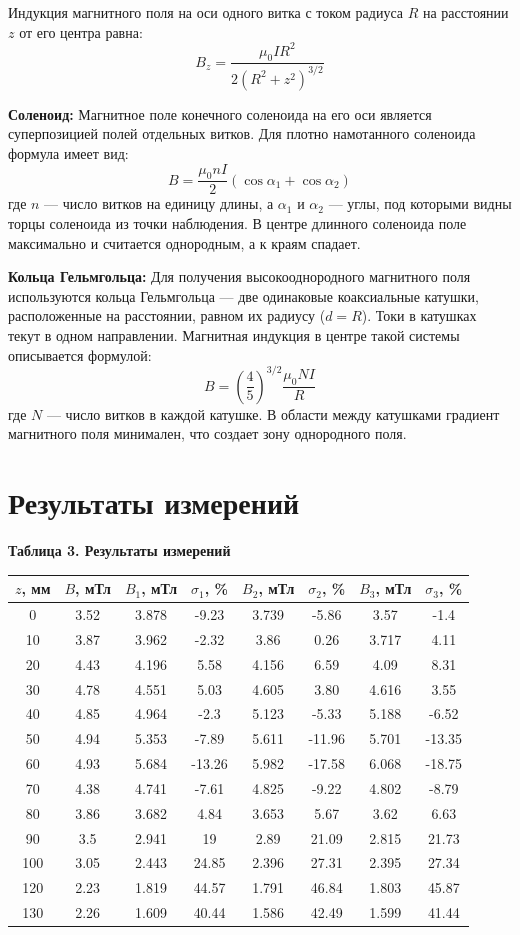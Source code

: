 \documentclass[a4paper,14pt]{extarticle}
\begin{document}
Индукция магнитного поля на оси одного витка с током радиуса $R$ на расстоянии $z$ от его центра равна:
$$B_z = \frac{\mu_0 I R^2}{2(R^2 + z^2)^{3/2}}$$

\textbf{Соленоид:}
Магнитное поле конечного соленоида на его оси является суперпозицией полей отдельных витков. Для плотно намотанного соленоида формула имеет вид:
$$B = \frac{\mu_0 n I}{2} (\cos\alpha_1 + \cos\alpha_2)$$
где $n$ — число витков на единицу длины, а $\alpha_1$ и $\alpha_2$ — углы, под которыми видны торцы соленоида из точки наблюдения. В центре длинного соленоида поле максимально и считается однородным, а к краям спадает.

\textbf{Кольца Гельмгольца:}
Для получения высокооднородного магнитного поля используются кольца Гельмгольца — две одинаковые коаксиальные катушки, расположенные на расстоянии, равном их радиусу ($d = R$). Токи в катушках текут в одном направлении. Магнитная индукция в центре такой системы описывается формулой:
$$B = \left(\frac{4}{5}\right)^{3/2} \frac{\mu_0 N I}{R}$$
где $N$ — число витков в каждой катушке. В области между катушками градиент магнитного поля минимален, что создает зону однородного поля.

\section*{Результаты измерений}

\begin{center}
\small
\textbf{Таблица 3. Результаты измерений}
\begin{tabular}{|c|c|c|c|c|c|c|c|}
\hline
$z$, мм & $B$, мТл & $B_1$, мТл & $\sigma_1$, \% & $B_2$, мТл & $\sigma_2$, \% & $B_3$, мТл & $\sigma_3$, \% \\ \hline
0 & 3.52 & 3.878 & -9.23 & 3.739 & -5.86 & 3.57 & -1.4 \\ \hline
10 & 3.87 & 3.962 & -2.32 & 3.86 & 0.26 & 3.717 & 4.11 \\ \hline
20 & 4.43 & 4.196 & 5.58 & 4.156 & 6.59 & 4.09 & 8.31 \\ \hline
30 & 4.78 & 4.551 & 5.03 & 4.605 & 3.80 & 4.616 & 3.55 \\ \hline
40 & 4.85 & 4.964 & -2.3 & 5.123 & -5.33 & 5.188 & -6.52 \\ \hline
50 & 4.94 & 5.353 & -7.89 & 5.611 & -11.96 & 5.701 & -13.35 \\ \hline
60 & 4.93 & 5.684 & -13.26 & 5.982 & -17.58 & 6.068 & -18.75 \\ \hline
70 & 4.38 & 4.741 & -7.61 & 4.825 & -9.22 & 4.802 & -8.79 \\ \hline
80 & 3.86 & 3.682 & 4.84 & 3.653 & 5.67 & 3.62 & 6.63 \\ \hline
90 & 3.5 &  2.941 & 19 & 2.89 & 21.09 & 2.815 & 21.73 \\ \hline
100 & 3.05 & 2.443 & 24.85 & 2.396 & 27.31 & 2.395 & 27.34 \\ \hline
120 & 2.23 & 1.819 & 44.57 & 1.791 & 46.84 & 1.803 & 45.87 \\ \hline
130 & 2.26 & 1.609 & 40.44 & 1.586 & 42.49 & 1.599 & 41.44 \\ \hline
\end{tabular}
\end{center}
\end{document}

